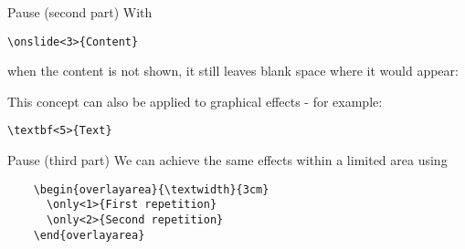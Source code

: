 \begin{frame}[fragile]{Pause (second part)}
    With
    \begin{verbatim}\onslide<3>{Content}\end{verbatim}
    when the content is not shown, it still leaves blank space where it would appear:\newline
    \newline
    \pause

    \noindent This concept can also be applied to graphical effects - for example:
    \begin{verbatim}\textbf<5>{Text}\end{verbatim}
\end{frame}





\begin{frame}[fragile]{Pause (third part)}
We can achieve the same effects within a limited area using
\begin{verbatim}
    \begin{overlayarea}{\textwidth}{3cm}
      \only<1>{First repetition}
      \only<2>{Second repetition}
    \end{overlayarea}
\end{verbatim}

\begin{overlayarea}{\textwidth}{2cm}
\end{overlayarea}
\end{frame}





